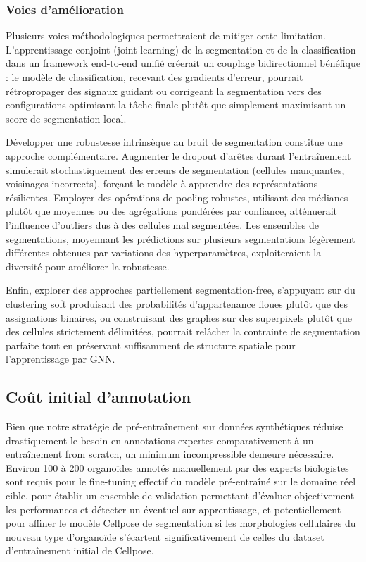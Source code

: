 \subsubsection{Voies d'amélioration}

Plusieurs voies méthodologiques permettraient de mitiger cette limitation. L'apprentissage conjoint (joint learning) de la segmentation et de la classification dans un framework end-to-end unifié créerait un couplage bidirectionnel bénéfique : le modèle de classification, recevant des gradients d'erreur, pourrait rétropropager des signaux guidant ou corrigeant la segmentation vers des configurations optimisant la tâche finale plutôt que simplement maximisant un score de segmentation local.

Développer une robustesse intrinsèque au bruit de segmentation constitue une approche complémentaire. Augmenter le dropout d'arêtes durant l'entraînement simulerait stochastiquement des erreurs de segmentation (cellules manquantes, voisinages incorrects), forçant le modèle à apprendre des représentations résilientes. Employer des opérations de pooling robustes, utilisant des médianes plutôt que moyennes ou des agrégations pondérées par confiance, atténuerait l'influence d'outliers dus à des cellules mal segmentées. Les ensembles de segmentations, moyennant les prédictions sur plusieurs segmentations légèrement différentes obtenues par variations des hyperparamètres, exploiteraient la diversité pour améliorer la robustesse.

Enfin, explorer des approches partiellement segmentation-free, s'appuyant sur du clustering soft produisant des probabilités d'appartenance floues plutôt que des assignations binaires, ou construisant des graphes sur des superpixels plutôt que des cellules strictement délimitées, pourrait relâcher la contrainte de segmentation parfaite tout en préservant suffisamment de structure spatiale pour l'apprentissage par GNN.

\subsection{Coût initial d'annotation}

Bien que notre stratégie de pré-entraînement sur données synthétiques réduise drastiquement le besoin en annotations expertes comparativement à un entraînement from scratch, un minimum incompressible demeure nécessaire. Environ 100 à 200 organoïdes annotés manuellement par des experts biologistes sont requis pour le fine-tuning effectif du modèle pré-entraîné sur le domaine réel cible, pour établir un ensemble de validation permettant d'évaluer objectivement les performances et détecter un éventuel sur-apprentissage, et potentiellement pour affiner le modèle Cellpose de segmentation si les morphologies cellulaires du nouveau type d'organoïde s'écartent significativement de celles du dataset d'entraînement initial de Cellpose. 

